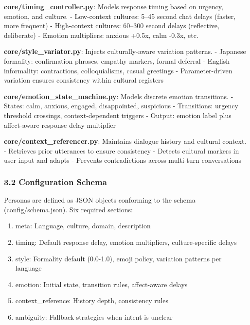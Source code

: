 \documentclass[
]{article}
\providecommand{\tightlist}{%
  \setlength{\itemsep}{0pt}\setlength{\parskip}{0pt}}
\begin{document}
\textbf{core/timing\_controller.py}: Models response timing based on
urgency, emotion, and culture. - Low-context cultures: 5--45 second chat
delays (faster, more frequent) - High-context cultures: 60--300 second
delays (reflective, deliberate) - Emotion multipliers: anxious +0.5x,
calm -0.3x, etc.

\textbf{core/style\_variator.py}: Injects culturally-aware variation
patterns. - Japanese formality: confirmation phrases, empathy markers,
formal deferral - English informality: contractions, colloquialisms,
casual greetings - Parameter-driven variation ensures consistency within
cultural registers

\textbf{core/emotion\_state\_machine.py}: Models discrete emotion
transitions. - States: calm, anxious, engaged, disappointed, suspicious
- Transitions: urgency threshold crossings, context-dependent triggers -
Output: emotion label plus affect-aware response delay multiplier

\textbf{core/context\_referencer.py}: Maintains dialogue history and
cultural context. - Retrieves prior utterances to ensure consistency -
Detects cultural markers in user input and adapts - Prevents
contradictions across multi-turn conversations

\hypertarget{configuration-schema}{%
\subsubsection{3.2 Configuration Schema}\label{configuration-schema}}

Personas are defined as JSON objects conforming to the schema
(config/schema.json). Six required sections:

\begin{enumerate}
\def\labelenumi{\arabic{enumi}.}
\tightlist
\item
  meta: Language, culture, domain, description
\item
  timing: Default response delay, emotion multipliers, culture-specific
  delays
\item
  style: Formality default (0.0-1.0), emoji policy, variation patterns
  per language
\item
  emotion: Initial state, transition rules, affect-aware delays
\item
  context\_reference: History depth, consistency rules
\item
  ambiguity: Fallback strategies when intent is unclear
\end{enumerate}
\end{document}
